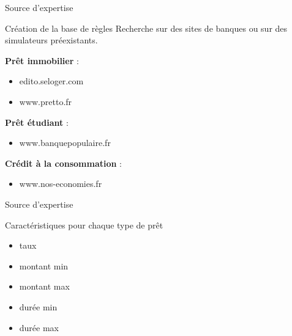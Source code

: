 \documentclass[
  ignorenonframetext,
]{beamer}
\providecommand{\tightlist}{%
  \setlength{\itemsep}{0pt}\setlength{\parskip}{0pt}}
\begin{document}
\begin{frame}{Source d'expertise}
\protect\hypertarget{source-dexpertise}{}
\begin{block}{Création de la base de règles}
\protect\hypertarget{cruxe9ation-de-la-base-de-ruxe8gles}{}
Recherche sur des sites de banques ou sur des simulateurs préexistants.

\textbf{Prêt immobilier} :

\begin{itemize}
\tightlist
\item
  edito.seloger.com\\
\item
  www.pretto.fr
\end{itemize}

\textbf{Prêt étudiant} :

\begin{itemize}
\tightlist
\item
  www.banquepopulaire.fr
\end{itemize}

\textbf{Crédit à la consommation} :

\begin{itemize}
\tightlist
\item
  www.nos-economies.fr
\end{itemize}
\end{block}
\end{frame}

\begin{frame}{Source d'expertise}
\protect\hypertarget{source-dexpertise-1}{}
\begin{block}{Caractéristiques pour chaque type de prêt}
\protect\hypertarget{caractuxe9ristiques-pour-chaque-type-de-pruxeat}{}
\begin{itemize}
\tightlist
\item
  taux
\item
  montant min
\item
  montant max
\item
  durée min
\item
  durée max
\end{itemize}
\end{block}
\end{frame}
\end{document}
